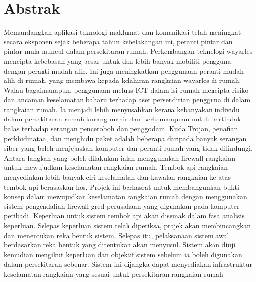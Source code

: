 \documentclass[../index.tex]{subfiles}
\begin{document}
\clearpage
\chapter*{Abstrak}

Memandangkan aplikasi teknologi maklumat dan komunikasi telah meningkat secara eksponen sejak
beberapa tahun kebelakangan ini, peranti pintar dan pintar mula muncul dalam persekitaran rumah.
Perkembangan teknologi wayarles mencipta kebebasan yang besar untuk dan lebih banyak mobiliti
pengguna dengan peranti mudah alih. Ini juga meningkatkan penggunaan peranti mudah alih di rumah,
yang membawa kepada kelahiran rangkaian wayarles di rumah. Walau bagaimanapun, penggunaan meluas ICT
dalam isi rumah mencipta risiko dan ancaman keselamatan baharu terhadap aset persendirian pengguna
di dalam rangkaian rumah. Ia menjadi lebih menyusahkan kerana kebanyakan individu dalam persekitaran
rumah kurang mahir dan berkemampuan untuk bertindak balas terhadap serangan penceroboh dan
penggodam. Kuda Trojan, penafian perkhidmatan, dan menghidu paket adalah beberapa daripada banyak
serangan siber yang boleh menjejaskan komputer dan peranti rumah yang tidak dilindungi. Antara
langkah yang boleh dilakukan ialah menggunakan firewall rangkaian untuk mewujudkan keselamatan
rangkaian rumah. Tembok api rangkaian menyediakan lebih banyak ciri keselamatan dan kawalan
rangkaian ke atas tembok api berasaskan hos. Projek ini berhasrat untuk membangunkan bukti konsep
dalam mewujudkan keselamatan rangkaian rumah dengan menggunakan sistem pengendalian firewall gred
perusahaan yang digunakan pada komputer peribadi. Keperluan untuk sistem tembok api akan disemak
dalam fasa analisis keperluan. Selepas keperluan sistem telah diperiksa, projek akan membincangkan
dan menentukan reka bentuk sistem. Selepas itu, pelaksanaan sistem awal berdasarkan reka bentuk yang
ditentukan akan menyusul. Sistem akan diuji kemudian mengikut keperluan dan objektif sistem sebelum
ia boleh digunakan dalam persekitaran sebenar. Sistem ini dijangka dapat menyediakan infrastruktur
keselamatan rangkaian yang sesuai untuk persekitaran rangkaian rumah

\clearpage
\end{document}
